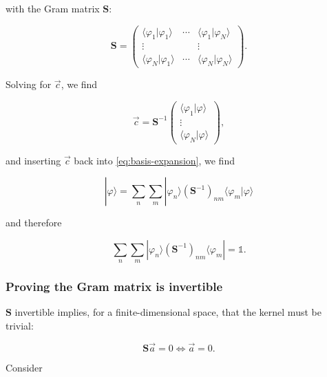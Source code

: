 with the Gram matrix $\mathbf{S}$:

\begin{equation}
\mathbf{S} = \begin{pmatrix}\langle\varphi_1|\varphi_1\rangle & \cdots & \langle\varphi_1|\varphi_N\rangle\\ \vdots & & \vdots \\ \langle\varphi_N|\varphi_1\rangle & \cdots & \langle\varphi_N|\varphi_N\rangle\end{pmatrix}.
\end{equation}

Solving for $\vec c$, we find

\begin{equation}
\vec c = \mathbf{S}^{-1}\begin{pmatrix}\langle\varphi_1|\varphi\rangle\\\vdots\\\langle\varphi_N|\varphi\rangle\end{pmatrix},
\end{equation}

and inserting $\vec c$ back into \eqref{eq:basis-expansion}, we find

\begin{equation}\label{eq:completeness-eigenfunction-phi}
|\varphi\rangle = \sum_n\sum_m |\varphi_n\rangle\left(\mathbf{S}^{-1}\right)_{nm}\langle\varphi_m|\varphi\rangle
\end{equation}

and therefore

\begin{equation}\label{eq:completeness-eigenfunction}
\sum_n\sum_m |\varphi_n\rangle\left(\mathbf{S}^{-1}\right)_{nm}\langle\varphi_m| = \mathbb{1}.
\end{equation}

\subsubsection*{Proving the Gram matrix is invertible}

$\mathbf{S}$ invertible implies, for a finite-dimensional space, that
the kernel must be trivial:

\begin{equation}
\mathbf{S}\vec a = 0 \iff \vec a = 0.
\end{equation}

Consider

